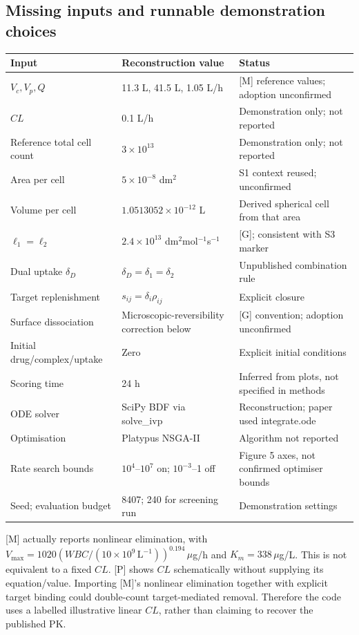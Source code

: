 \documentclass[11pt,a4paper]{article}
\begin{document}
\subsection{Missing inputs and runnable demonstration choices}
\begin{longtable}{p{.36\linewidth}p{.32\linewidth}p{.26\linewidth}}
\toprule Input & Reconstruction value & Status\\\midrule\endhead
$V_c,V_p,Q$ & 11.3 L, 41.5 L, 1.05 L/h & [M] reference values; adoption unconfirmed\\
$CL$ & 0.1 L/h & Demonstration only; not reported\\
Reference total cell count & $3\times10^{13}$ & Demonstration only; not reported\\
Area per cell & $5\times10^{-8}$ dm$^2$ & S1 context reused; unconfirmed\\
Volume per cell & $1.0513052\times10^{-12}$ L & Derived spherical cell from that area\\
$\ell_1=\ell_2$ & $2.4\times10^{13}$ dm$^2$mol$^{-1}$s$^{-1}$ & [G]; consistent with S3 marker\\
Dual uptake $\delta_D$ & $\delta_D=\delta_1=\delta_2$ & Unpublished combination rule\\
Target replenishment & $s_{ij}=\delta_i\rho_{ij}$ & Explicit closure\\
Surface dissociation & Microscopic-reversibility correction below & [G] convention; adoption unconfirmed\\
Initial drug/complex/uptake & Zero & Explicit initial conditions\\
Scoring time & 24 h & Inferred from plots, not specified in methods\\
ODE solver & SciPy BDF via solve\_ivp & Reconstruction; paper used integrate.ode\\
Optimisation & Platypus NSGA-II & Algorithm not reported\\
Rate search bounds & $10^4$--$10^7$ on; $10^{-3}$--1 off & Figure 5 axes, not confirmed optimiser bounds\\
Seed; evaluation budget & 8407; 240 for screening run & Demonstration settings\\
\bottomrule
\end{longtable}
[M] actually reports nonlinear elimination, with $V_{\max}=1020(WBC/(10\times10^9\,\mathrm{L^{-1}}))^{0.194}\,\mu$g/h and $K_m=338\,\mu$g/L. This is not equivalent to a fixed $CL$. [P] shows $CL$ schematically without supplying its equation/value. Importing [M]'s nonlinear elimination together with explicit target binding could double-count target-mediated removal. Therefore the code uses a labelled illustrative linear $CL$, rather than claiming to recover the published PK.
\end{document}
